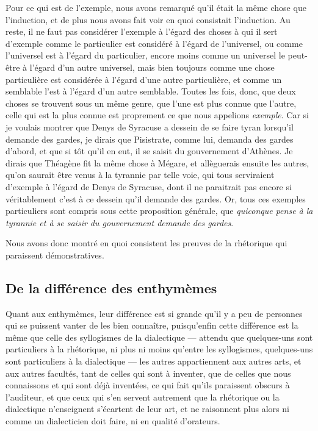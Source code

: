 Pour ce qui est de l'exemple, nous avons remarqué qu'il était la même chose que l'induction, et de plus nous avons fait voir en quoi consistait l'induction.
Au reste, il ne faut pas considérer l'exemple à l'égard des choses à qui il sert d'exemple comme le particulier est considéré à l'égard de l'universel, ou
comme l'universel est à l'égard du particulier, encore moins comme un universel le peut-être à l'égard d'un autre universel, mais bien toujours comme une chose
particulière est considérée à l'égard d'une autre particulière, et comme un semblable l'est à l'égard d'un autre semblable. Toutes les fois, donc, que deux
choses se trouvent sous un même genre, que l'une est plus connue que l'autre, celle qui est la plus connue est proprement ce que nous appelions \emph{exemple}.
Car si je voulais montrer que Denys de Syracuse a dessein de se faire tyran lorsqu'il demande des gardes, je dirais que Pisistrate, comme lui, demanda des gardes
d'abord, et que si tôt qu'il en eut, il se saisit du gouvernement d'Athènes. Je dirais que Théagène fit la même chose à Mégare, et allèguerais ensuite les autres,
qu'on saurait être venus à la tyrannie par telle voie, qui tous serviraient d'exemple à l'égard de Denys de Syracuse, dont il ne paraitrait pas encore si véritablement
c'est à ce dessein qu'il demande des gardes. Or, tous ces exemples particuliers sont compris sous cette proposition générale, que \emph{quiconque pense à la tyrannie
et à se saisir du gouvernement demande des gardes}.

Nous avons donc montré en quoi consistent les preuves de la rhétorique qui paraissent démonstratives.

\subsection{De la différence des enthymèmes}

Quant aux enthymèmes, leur différence est si grande qu'il y a peu de personnes qui se puissent vanter de les bien connaître, puisqu'enfin cette
différence est la même que celle des  syllogismes de la dialectique --- attendu que quelques-uns sont particuliers à la rhétorique, ni plus ni moins
qu'entre les syllogismes, quelques-uns sont particuliers à la dialectique --- les autres  appartiennent aux autres arts, et aux autres facultés, tant
de celles qui sont à inventer, que de celles que nous connaissons et qui sont déjà inventées, ce qui fait qu'ils paraissent obscurs à l'auditeur, et
que ceux qui s'en servent autrement que la rhétorique ou la dialectique n'enseignent s'écartent de leur art, et ne raisonnent  plus alors ni comme un
dialecticien doit faire, ni en qualité d'orateurs.

